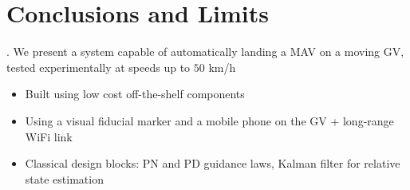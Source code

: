 \section{Conclusions and Limits}

\begin{frame}{\thesection. \insertsection}
	We present a system capable of automatically landing a MAV on a moving GV, tested experimentally at speeds up to $50$ km/h %
	\begin{itemize}
		\item Built using low cost off-the-shelf components
		\vspace{0.5cm}
		\item Using a visual fiducial marker and a mobile phone on the GV + long-range WiFi link
		\vspace{0.5cm}
		\item Classical design blocks: PN and PD guidance laws, Kalman filter for relative state estimation
	\end{itemize}
\end{frame}





